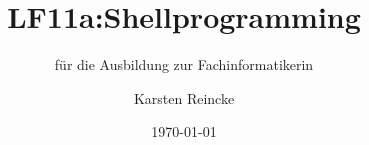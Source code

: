 \documentclass[]{beamer}
\title{LF11a:Shellprogramming}
\subtitle{für die Ausbildung zur Fachinformatikerin}
\institute{GS-LDK}
\author{Karsten Reincke}
\date{\today}
\def\cfgGl{../../../cfg.gl/}
\begin{document}

\begin{frame}
  \titlepage
\end{frame}






\logo{}
\newpage



%
\end{document}
